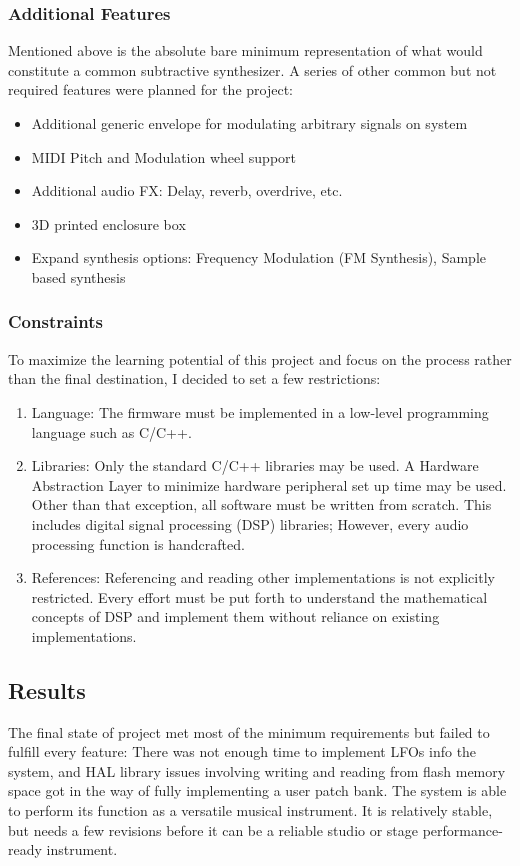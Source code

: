 \documentclass[acmlarge,screen]{acmart}
\begin{document}
	\subsubsection{Additional Features}
	Mentioned above is the absolute bare minimum representation of what would constitute a common subtractive synthesizer. A series of other common but not required features were planned for the project:
	\begin{itemize}
		\item Additional generic envelope for modulating arbitrary signals on system
		\item MIDI Pitch and Modulation wheel support
		\item Additional audio FX: Delay, reverb, overdrive, etc.
		\item 3D printed enclosure box
		\item Expand synthesis options: Frequency Modulation (FM Synthesis), Sample based synthesis
	\end{itemize}
	
	\subsubsection{Constraints}
	To maximize the learning potential of this project and focus on the process rather than the final destination, I decided to set a few restrictions:
	\begin{enumerate}
		\item Language: The firmware must be implemented in a low-level programming language such as C/C++.
		\item Libraries: Only the standard C/C++ libraries may be used. A Hardware Abstraction Layer to minimize hardware peripheral set up time may be used. Other than that exception, all software must be written from scratch. This includes digital signal processing (DSP) libraries; However, every audio processing function is handcrafted.
		\item References: Referencing and reading other implementations is not explicitly restricted. Every effort must be put forth to understand the mathematical concepts of DSP and implement them without reliance on existing implementations.
	\end{enumerate}
	
\subsection{Results}
	The final state of project met most of the minimum requirements but failed to fulfill every feature: There was not enough time to implement LFOs info the system, and HAL library issues involving writing and reading from flash memory space got in the way of fully implementing a user patch bank. The system is able to perform its function as a versatile musical instrument. It is relatively stable, but needs a few revisions before it can be a reliable studio or stage performance-ready instrument.
	
\end{document}

